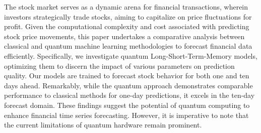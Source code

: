 The stock market serves as a dynamic arena for financial transactions, wherein investors strategically trade stocks, aiming to capitalize on price fluctuations for profit. Given the computational complexity and cost associated with predicting stock price movements, this paper undertakes a comparative analysis between classical and quantum machine learning methodologies to forecast financial data efficiently. Specifically, we investigate quantum Long-Short-Term-Memory models, optimizing them to discern the impact of various parameters on prediction quality.
Our models are trained to forecast stock behavior for both one and ten days ahead. Remarkably, while the quantum approach demonstrates comparable performance to classical methods for one-day predictions, it excels in the ten-day forecast domain. These findings suggest the potential of quantum computing to enhance financial time series forecasting. However, it is imperative to note that the current limitations of quantum hardware remain prominent.